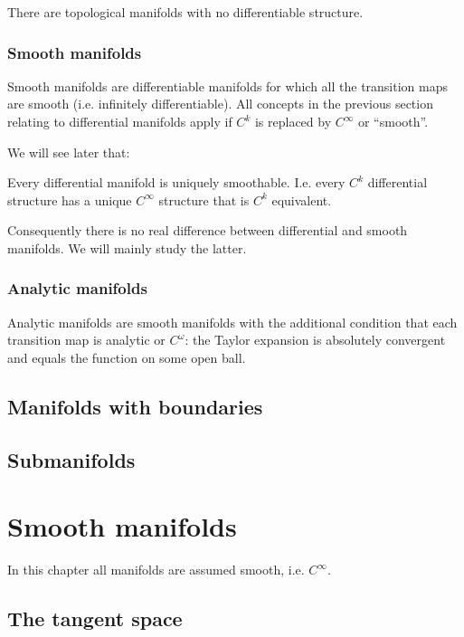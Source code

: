 There are topological manifolds with no differentiable structure.

\subsection{Smooth manifolds}
Smooth manifolds are differentiable manifolds for which all the transition maps are smooth (i.e. infinitely differentiable). All concepts in the previous section relating to differential manifolds apply if $C^k$ is replaced by $C^\infty$ or ``smooth''.

We will see later that:
\begin{proposition}
Every differential manifold is uniquely smoothable. I.e. every $C^k$ differential structure has a unique $C^\infty$ structure that is $C^k$ equivalent.
\end{proposition}
Consequently there is no real difference between differential and smooth manifolds. We will mainly study the latter.


\subsection{Analytic manifolds}
Analytic manifolds are smooth manifolds with the additional condition that each transition map is analytic or $C^\omega$: the Taylor expansion is absolutely convergent and equals the function on some open ball.

\section{Manifolds with boundaries}

\section{Submanifolds}




\chapter{Smooth manifolds}
In this chapter all manifolds are assumed smooth, i.e. $C^\infty$.
\section{The tangent space}
